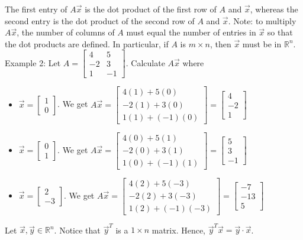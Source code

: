 \documentclass[10pt,letter]{article}
\begin{document}
The first entry of $A\vec{x}$ is the dot product of the first row of $A$ and $\vec{x}$, whereas the second entry is the dot product of the second row of $A$ and $\vec{x}$. Note: to multiply $A\vec{x}$, the number of columns of $A$ must equal the number of entries in $\vec{x}$ so that the dot products are defined. In particular, if $A$ is $m\times n$, then $\vec{x}$ must be in $\mathbb{R}^n$. \\ 
Example 2: Let $A= \begin{bmatrix}4&5\\-2&3\\1&-1\end{bmatrix}$. Calculate $A\vec{x}$ where \begin{itemize}
    \item $\vec{x}=\begin{bmatrix}1\\0\end{bmatrix}$. We get $A\vec{x}=\begin{bmatrix}4(1)+5(0)\\-2(1)+3(0)\\1(1)+(-1)(0)\end{bmatrix} = \begin{bmatrix}4\\-2\\1\end{bmatrix}$ 
    \item $\vec{x}=\begin{bmatrix}0\\1\end{bmatrix}$. We get $A\vec{x}=\begin{bmatrix}4(0)+5(1)\\-2(0)+3(1)\\1(0)+(-1)(1)\end{bmatrix} = \begin{bmatrix}5\\3\\-1\end{bmatrix}$ 
    \item $\vec{x}=\begin{bmatrix}2\\-3\end{bmatrix}$. We get $A\vec{x}=\begin{bmatrix}4(2)+5(-3)\\-2(2)+3(-3)\\1(2)+(-1)(-3)\end{bmatrix} = \begin{bmatrix}-7\\-13\\5\end{bmatrix}$ 
\end{itemize}
Let $\vec{x},\vec{y}\in\mathbb{R}^n$. Notice that $\vec{y}^T$ is a $1\times n$ matrix. Hence, $\vec{y}^T\vec{x}=\vec{y}\cdot\vec{x}$.  
\end{document}
